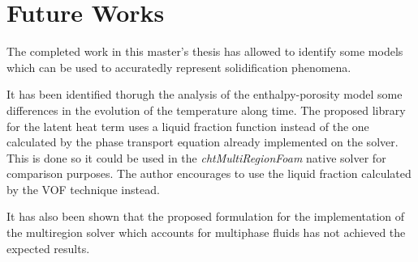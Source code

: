 \chapter{Future Works} %

\label{Chapter6}
\setlength{\parindent}{0.5cm} The completed work in this master's thesis has allowed to identify some models which can be used to accuratedly represent solidification phenomena. 

\noindent It has been identified thorugh the analysis of the enthalpy-porosity model some differences in the evolution of the temperature along time. The proposed library for the latent heat term uses a liquid fraction function instead of the one calculated by the phase transport equation already implemented on the solver. This is done so it could be used in the \textit{chtMultiRegionFoam} native solver for comparison purposes. The author encourages to use the liquid fraction calculated by the VOF technique instead.

\noindent It has also been shown that the proposed formulation for the implementation of the multiregion solver which accounts for multiphase fluids has not achieved the expected results.  